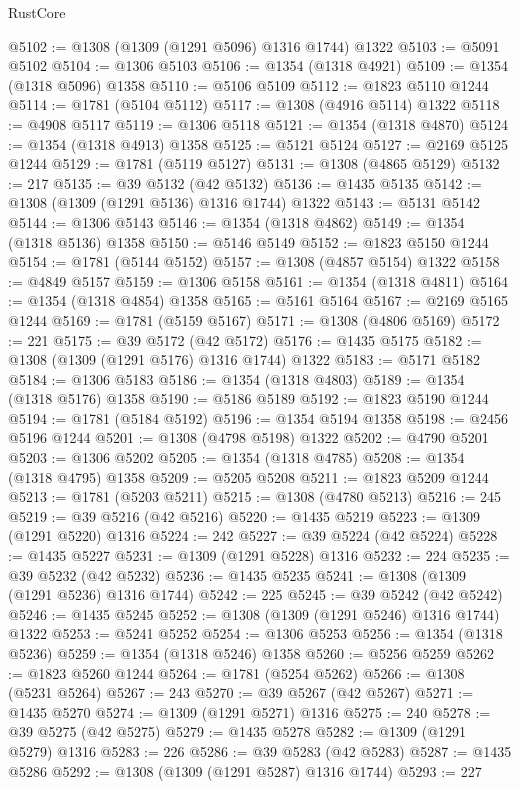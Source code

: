 \begin{lexlean}{RustCore}
\begin{coremodule}
@5102 := @1308 (@1309 (@1291 @5096) @1316 @1744) @1322
@5103 := @5091 @5102
@5104 := @1306 @5103
@5106 := @1354 (@1318 @4921)
@5109 := @1354 (@1318 @5096) @1358
@5110 := @5106 @5109
@5112 := @1823 @5110 @1244
@5114 := @1781 (@5104 @5112)
@5117 := @1308 (@4916 @5114) @1322
@5118 := @4908 @5117
@5119 := @1306 @5118
@5121 := @1354 (@1318 @4870)
@5124 := @1354 (@1318 @4913) @1358
@5125 := @5121 @5124
@5127 := @2169 @5125 @1244
@5129 := @1781 (@5119 @5127)
@5131 := @1308 (@4865 @5129)
@5132 := 217
@5135 := @39 @5132 (@42 @5132)
@5136 := @1435 @5135
@5142 := @1308 (@1309 (@1291 @5136) @1316 @1744) @1322
@5143 := @5131 @5142
@5144 := @1306 @5143
@5146 := @1354 (@1318 @4862)
@5149 := @1354 (@1318 @5136) @1358
@5150 := @5146 @5149
@5152 := @1823 @5150 @1244
@5154 := @1781 (@5144 @5152)
@5157 := @1308 (@4857 @5154) @1322
@5158 := @4849 @5157
@5159 := @1306 @5158
@5161 := @1354 (@1318 @4811)
@5164 := @1354 (@1318 @4854) @1358
@5165 := @5161 @5164
@5167 := @2169 @5165 @1244
@5169 := @1781 (@5159 @5167)
@5171 := @1308 (@4806 @5169)
@5172 := 221
@5175 := @39 @5172 (@42 @5172)
@5176 := @1435 @5175
@5182 := @1308 (@1309 (@1291 @5176) @1316 @1744) @1322
@5183 := @5171 @5182
@5184 := @1306 @5183
@5186 := @1354 (@1318 @4803)
@5189 := @1354 (@1318 @5176) @1358
@5190 := @5186 @5189
@5192 := @1823 @5190 @1244
@5194 := @1781 (@5184 @5192)
@5196 := @1354 @5194 @1358
@5198 := @2456 @5196 @1244
@5201 := @1308 (@4798 @5198) @1322
@5202 := @4790 @5201
@5203 := @1306 @5202
@5205 := @1354 (@1318 @4785)
@5208 := @1354 (@1318 @4795) @1358
@5209 := @5205 @5208
@5211 := @1823 @5209 @1244
@5213 := @1781 (@5203 @5211)
@5215 := @1308 (@4780 @5213)
@5216 := 245
@5219 := @39 @5216 (@42 @5216)
@5220 := @1435 @5219
@5223 := @1309 (@1291 @5220) @1316
@5224 := 242
@5227 := @39 @5224 (@42 @5224)
@5228 := @1435 @5227
@5231 := @1309 (@1291 @5228) @1316
@5232 := 224
@5235 := @39 @5232 (@42 @5232)
@5236 := @1435 @5235
@5241 := @1308 (@1309 (@1291 @5236) @1316 @1744)
@5242 := 225
@5245 := @39 @5242 (@42 @5242)
@5246 := @1435 @5245
@5252 := @1308 (@1309 (@1291 @5246) @1316 @1744) @1322
@5253 := @5241 @5252
@5254 := @1306 @5253
@5256 := @1354 (@1318 @5236)
@5259 := @1354 (@1318 @5246) @1358
@5260 := @5256 @5259
@5262 := @1823 @5260 @1244
@5264 := @1781 (@5254 @5262)
@5266 := @1308 (@5231 @5264)
@5267 := 243
@5270 := @39 @5267 (@42 @5267)
@5271 := @1435 @5270
@5274 := @1309 (@1291 @5271) @1316
@5275 := 240
@5278 := @39 @5275 (@42 @5275)
@5279 := @1435 @5278
@5282 := @1309 (@1291 @5279) @1316
@5283 := 226
@5286 := @39 @5283 (@42 @5283)
@5287 := @1435 @5286
@5292 := @1308 (@1309 (@1291 @5287) @1316 @1744)
@5293 := 227

\end{coremodule}
\end{lexlean}
